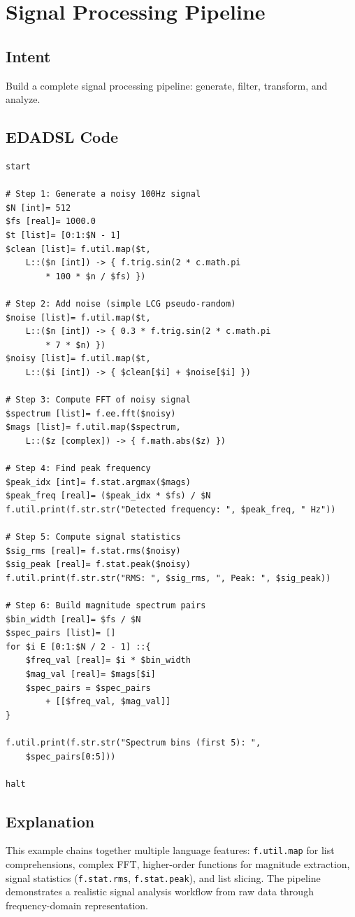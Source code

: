 \section{Signal Processing Pipeline}
\subsection{Intent}
Build a complete signal processing pipeline: generate, filter, transform, and analyze.

\subsection{EDADSL Code}
\begin{verbatim}
start

# Step 1: Generate a noisy 100Hz signal
$N [int]= 512
$fs [real]= 1000.0
$t [list]= [0:1:$N - 1]
$clean [list]= f.util.map($t,
    L::($n [int]) -> { f.trig.sin(2 * c.math.pi
        * 100 * $n / $fs) })

# Step 2: Add noise (simple LCG pseudo-random)
$noise [list]= f.util.map($t,
    L::($n [int]) -> { 0.3 * f.trig.sin(2 * c.math.pi
        * 7 * $n) })
$noisy [list]= f.util.map($t,
    L::($i [int]) -> { $clean[$i] + $noise[$i] })

# Step 3: Compute FFT of noisy signal
$spectrum [list]= f.ee.fft($noisy)
$mags [list]= f.util.map($spectrum,
    L::($z [complex]) -> { f.math.abs($z) })

# Step 4: Find peak frequency
$peak_idx [int]= f.stat.argmax($mags)
$peak_freq [real]= ($peak_idx * $fs) / $N
f.util.print(f.str.str("Detected frequency: ", $peak_freq, " Hz"))

# Step 5: Compute signal statistics
$sig_rms [real]= f.stat.rms($noisy)
$sig_peak [real]= f.stat.peak($noisy)
f.util.print(f.str.str("RMS: ", $sig_rms, ", Peak: ", $sig_peak))

# Step 6: Build magnitude spectrum pairs
$bin_width [real]= $fs / $N
$spec_pairs [list]= []
for $i E [0:1:$N / 2 - 1] ::{
    $freq_val [real]= $i * $bin_width
    $mag_val [real]= $mags[$i]
    $spec_pairs = $spec_pairs
        + [[$freq_val, $mag_val]]
}

f.util.print(f.str.str("Spectrum bins (first 5): ",
    $spec_pairs[0:5]))

halt
\end{verbatim}

\subsection{Explanation}
This example chains together multiple language features: \texttt{f.util.map} for list comprehensions, complex FFT, higher-order functions for magnitude extraction, signal statistics (\texttt{f.stat.rms}, \texttt{f.stat.peak}), and list slicing. The pipeline demonstrates a realistic signal analysis workflow from raw data through frequency-domain representation.

